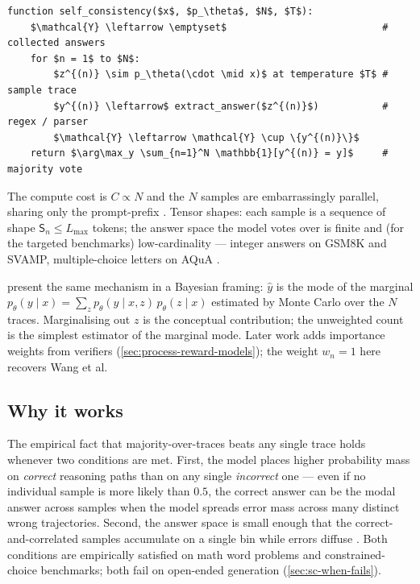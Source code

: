 \begin{lstlisting}[mathescape=true, numbers=none, frame=single, caption={Self-consistency \citep[\S 3]{wang2022-self-consistency}. Inputs: problem $x$, model $p_\theta$, sample count $N$, temperature $T>0$. Output: aggregated answer $\hat y$.}, label=alg:sc]
function self_consistency($x$, $p_\theta$, $N$, $T$):
    $\mathcal{Y} \leftarrow \emptyset$                           # collected answers
    for $n = 1$ to $N$:
        $z^{(n)} \sim p_\theta(\cdot \mid x)$ at temperature $T$ # sample trace
        $y^{(n)} \leftarrow$ extract_answer($z^{(n)}$)           # regex / parser
        $\mathcal{Y} \leftarrow \mathcal{Y} \cup \{y^{(n)}\}$
    return $\arg\max_y \sum_{n=1}^N \mathbb{1}[y^{(n)} = y]$     # majority vote
\end{lstlisting}

The compute cost is $C \propto N$ and the $N$ samples are embarrassingly
parallel, sharing only the prompt-prefix 
\citep[\S 2.1]{snell2024}. Tensor shapes: each sample is a sequence of
shape $\mathsf{S}_n \le L_{\max}$ tokens; the answer space the model
votes over is finite and (for the targeted benchmarks) low-cardinality
— integer answers on GSM8K and SVAMP, multiple-choice letters on AQuA
\citep[\S 4]{wang2022-self-consistency}.

\citet[\S 3]{wang2022-self-consistency} present the same mechanism in a
Bayesian framing: $\hat y$ is the mode of the marginal
$p_\theta(y \mid x) = \sum_z p_\theta(y \mid x, z)\, p_\theta(z \mid x)$
estimated by Monte Carlo over the $N$ traces. Marginalising out $z$ is
the conceptual contribution; the unweighted count is the simplest
estimator of the marginal mode. Later work adds importance weights from
verifiers (\cref{sec:process-reward-models}); the weight $w_n = 1$ here
recovers Wang et al.

\subsection{Why it works}
\label{sec:sc-why}

The empirical fact that majority-over-traces beats any single trace
holds whenever two conditions are met. First, the model places higher
probability mass on \emph{correct} reasoning paths than on any single
\emph{incorrect} one — even if no individual sample is more likely
than $0.5$, the correct answer can be the modal answer across samples
when the model spreads error mass across many distinct wrong
trajectories. Second, the answer space is small enough that the
correct-and-correlated samples accumulate on a single bin while errors
diffuse \citep[\S 3]{wang2022-self-consistency}. Both conditions are
empirically satisfied on math word problems and constrained-choice
benchmarks; both fail on open-ended generation
(\cref{sec:sc-when-fails}).


